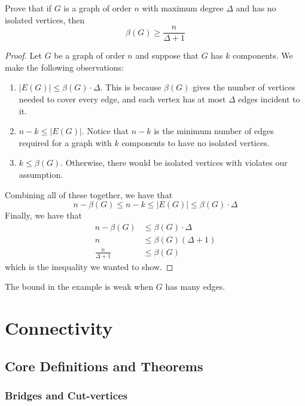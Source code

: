 \begin{nexample}
  Prove that if \(G\) is a graph of order \(n\) with maximum degree \(\Delta\)
  and has no isolated vertices, then 
  \[ \beta(G) \geq \frac{n}{\Delta + 1} \]

  \begin{proof}
    Let \(G\) be a graph of order \(n\) and suppose that \(G\) has \(k\)
    components. We make the following observations:
    \begin{enumerate}
      \item \(|E(G)| \leq \beta(G) \cdot \Delta\). This is because
        \(\beta(G)\) gives the number of vertices needed to cover every edge,
        and each vertex has at most \(\Delta\) edges incident to it.
      \item \(n-k \leq |E(G)|\). Notice that \(n-k\) is the minimum number of
        edges required for a graph with \(k\) components to have no isolated
        vertices.
      \item \(k \leq \beta(G)\). Otherwise, there would be isolated vertices
        with violates our assumption.
    \end{enumerate}
    Combining all of these together, we have that
    \[ n-\beta(G) \leq n-k \leq |E(G)| \leq \beta(G) \cdot \Delta \]
    Finally, we have that 
    \[
    \begin{aligned}
      n - \beta(G) &\leq \beta(G) \cdot \Delta \\ 
      n &\leq \beta(G) (\Delta + 1) \\ 
      \frac{n}{\Delta + 1} &\leq \beta(G)
    \end{aligned}
    \]
    which is the inequality we wanted to show.
  \end{proof}
\end{nexample}

\begin{remark}
  The bound in the example is weak when \(G\) has many edges. 
\end{remark}

\chapter{Connectivity}

\section{Core Definitions and Theorems}

\subsection{Bridges and Cut-vertices}

